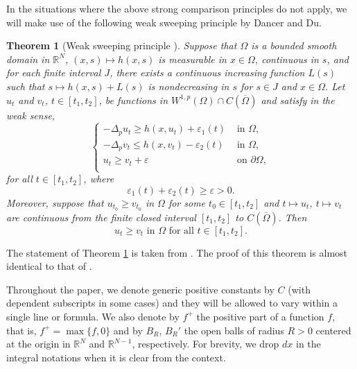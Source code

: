 \documentclass[reqno]{amsart}
\theoremstyle{plain}
\newtheorem{theorem}{Theorem}
\theoremstyle{definition}
\theoremstyle{remark}
\begin{document}
	In the situations where the above strong comparison principles do not apply, we will make use of the following weak sweeping principle by Dancer and Du.
	\begin{theorem}[Weak sweeping principle \cite{MR3058211}]\label{th:wsp}
		Suppose that $\Omega$ is a bounded smooth domain in $\mathbb{R}^N$, $(x, s)\mapsto h(x, s)$ is measurable in $x \in \Omega$,
		continuous in $s$, and for each finite interval $J$, there exists a continuous increasing function $L(s)$ such
		that $s\mapsto h(x, s) + L(s)$ is nondecreasing in $s$ for $s \in J$ and $x \in \Omega$. Let $u_t$ and $v_t$, $t \in [t_1, t_2]$, be functions in $W^{1,p}(\Omega) \cap C(\overline \Omega)$ and satisfy in the weak sense,
		\[
		\begin{cases}
			-\Delta_p u_t \ge h(x,u_t) + \varepsilon_1(t) & \text{ in } \Omega,\\
			-\Delta_p v_t \le h(x,v_t) - \varepsilon_2(t) & \text{ in } \Omega,\\
			u_t \ge v_t + \varepsilon & \text{ on } \partial\Omega,\\
		\end{cases}
		\]
		for all $t \in [t_1, t_2]$, where
		\[
		\varepsilon_1(t) + \varepsilon_2(t) \ge \varepsilon > 0.
		\]
		Moreover, suppose that $u_{t_0} \ge v_{t_0}$ in $\Omega$ for some $t_0 \in [t_1, t_2]$ and $t \mapsto u_t$, $t \mapsto v_t$ are continuous from the finite closed interval $[t_1, t_2]$ to $C(\overline \Omega)$. Then
		\[
		u_t \ge v_t \text{ in } \Omega \text{ for all } t \in [t_1, t_2].
		\]
	\end{theorem}
	
	The statement of Theorem \ref{th:wsp} is taken from \cite{MR3058211}. The proof of this theorem is almost identical to that of \cite[Lemma 2.7]{MR1955278}.
	
	Throughout the paper, we denote generic positive constants by $C$ (with dependent subscripts in some cases) and they will be allowed to vary within a single line or formula. We also denote by $f^+$ the positive part of a function $f$, that is, $f^+ = \max\{f,0\}$ and by $B_R$, $B_R'$ the open balls of radius $R>0$ centered at the origin in $\mathbb{R}^N$ and $\mathbb{R}^{N-1}$, respectively. For brevity, we drop $dx$ in the integral notations when it is clear from the context.
	
\end{document}
